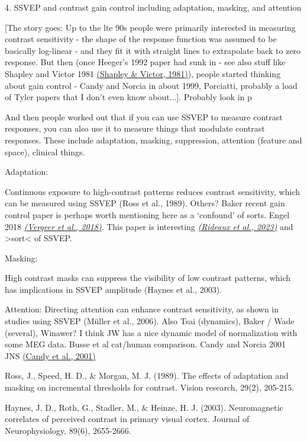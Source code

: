 \documentclass[
  letterpaper,
  DIV=11,
  numbers=noendperiod]{scrartcl}
\begin{document}
\label{anchor-6}{}4. SSVEP and contrast gain control
including adaptation, masking, and attention

{[}The story goes: Up to the lte 90s people were primarily interested in
measuring contrast sensitivity - the shape of the response function was
assumed to be basically log-linear - and they fit it with straight lines
to extrapolate back to zero response. But then (once Heeger's 1992 paper
had sunk in - see also stuff like Shapley and Victor 1981
\href{https://www.zotero.org/google-docs/?zAmtgj}{(Shapley \& Victor,
1981)}), people started thinking about gain control - Candy and Norcia
in about 1999, Porciatti, probably a load of Tyler papers that I don't
even know about...{]}. Probably look in p

And then people worked out that if you can use SSVEP to measure contrast
responses, you can also use it to measure things that modulate contrast
responses. These include adaptation, masking, suppression, attention
(feature and space), clinical things.

\label{anchor-7}{}Adaptation:

Continuous exposure to high-contrast patterns reduces contrast
sensitivity, which can be measured using SSVEP (Ross et al., 1989).
Others? Baker recent gain control paper is perhaps worth mentioning here
as a `confound' of sorts. Engel 2018
\href{https://www.zotero.org/google-docs/?kdURiS}{\emph{(Vergeer et al.,
2018)}}. This paper is interesting
\href{https://www.zotero.org/google-docs/?J2EO3d}{\emph{(Rideaux et al.,
2023)}} and \textgreater sort\textless{} of SSVEP.

\label{anchor-8}{}Masking:

High contrast masks can suppress the visibility of low contrast
patterns, which has implications in SSVEP amplitude (Haynes et al.,
2003).

Attention: Directing attention can enhance contrast sensitivity, as
shown in studies using SSVEP (Müller et al., 2006). Also Tsai
(dynamics), Baker / Wade (several), Winawer? I think JW has a nice
dynamic model of normalization with some MEG data. Busse et al cat/human
comparison. Candy and Norcia 2001 JNS
\href{https://www.zotero.org/google-docs/?7hhs5Z}{(Candy et al., 2001)}

Ross, J., Speed, H. D., \& Morgan, M. J. (1989). The effects of
adaptation and masking on incremental thresholds for contrast. Vision
research, 29(2), 205-215.

Haynes, J. D., Roth, G., Stadler, M., \& Heinze, H. J. (2003).
Neuromagnetic correlates of perceived contrast in primary visual cortex.
Journal of Neurophysiology, 89(6), 2655-2666.
\end{document}
